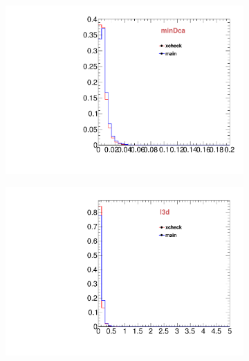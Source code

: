 \begin{figure}
\begin{subfigure}[b]{0.2\textwidth}
                \includegraphics[width=\textwidth]{Figures/VariablesComparison/Data_endcaps_figs/docatrk}
                \label{fig:Data_endcaps_docatrk}
        \end{subfigure}
        \begin{subfigure}[b]{0.2\textwidth}
                \centering
                \includegraphics[width=\textwidth]{Figures/VariablesComparison/Data_endcaps_figs/fl3d}
                \label{fig:Data_endcaps_fl3d}
        \end{subfigure}
        \begin{subfigure}[b]{0.2\textwidth}
                \centering

\end{subfigure}
\end{figure}

